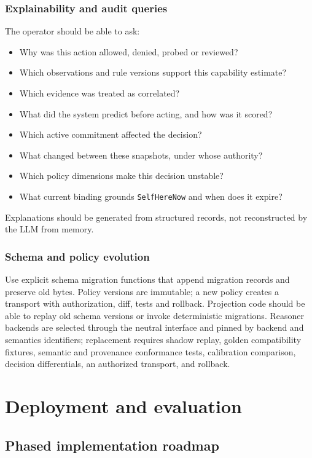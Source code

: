 \documentclass[11pt,oneside]{report}
\newcommand{\SelfHereNow}{\texttt{SelfHereNow}}
\begin{document}
\section{Explainability and audit queries}

The operator should be able to ask:

\begin{itemize}
  \item Why was this action allowed, denied, probed or reviewed?
  \item Which observations and rule versions support this capability estimate?
  \item Which evidence was treated as correlated?
  \item What did the system predict before acting, and how was it scored?
  \item Which active commitment affected the decision?
  \item What changed between these snapshots, under whose authority?
  \item Which policy dimensions make this decision unstable?
  \item What current binding grounds \SelfHereNow{} and when does it expire?
\end{itemize}

Explanations should be generated from structured records, not reconstructed by the LLM from memory.

\section{Schema and policy evolution}

Use explicit schema migration functions that append migration records and preserve old bytes. Policy versions are immutable; a new policy creates a transport with authorization, diff, tests and rollback. Projection code should be able to replay old schema versions or invoke deterministic migrations. Reasoner backends are selected through the neutral interface and pinned by backend and semantics identifiers; replacement requires shadow replay, golden compatibility fixtures, semantic and provenance conformance tests, calibration comparison, decision differentials, an authorized transport, and rollback.

\part{Deployment and evaluation}

\chapter{Phased implementation roadmap}
\end{document}
